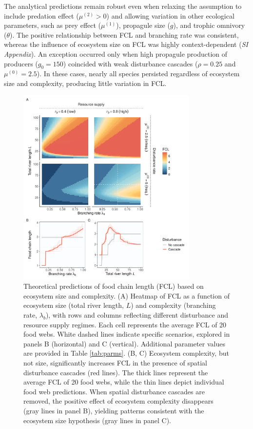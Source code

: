 \documentclass[11pt, class=article, crop=false]{standalone}
\begin{document}
The analytical predictions remain robust even when relaxing the assumption to include predation effect ($\mu^{(2)} > 0$) and allowing variation in other ecological parameters, such as prey effect ($\mu^{(1)}$), propagule size ($g$), and trophic omnivory ($\theta$).
The positive relationship between FCL and branching rate was consistent, whereas the influence of ecosystem size on FCL was highly context-dependent (\textit{SI Appendix}).
An exception occurred only when high propagule production of producers ($g_0 = 150$) coincided with weak disturbance cascades ($\rho = 0.25$ and $\mu^{(0)} = 2.5$).
In these cases, nearly all species persisted regardless of ecosystem size and complexity, producing little variation in FCL.

\begin{figure}
    \centering
    \includegraphics[width=0.8\textwidth]{data_fmt/fig_theo_main.pdf}
    \caption{Theoretical predictions of food chain length (FCL) based on ecosystem size and complexity. (A) Heatmap of FCL as a function of ecosystem size (total river length, $L$) and complexity (branching rate, $\lambda_b$), with rows and columns reflecting different disturbance and resource supply regimes. Each cell represents the average FCL of 20 food webs. White dashed lines indicate specific scenarios, explored in panels B (horizontal) and C (vertical). Additional parameter values are provided in Table \ref{tab:parms}. (B, C) Ecosystem complexity, but not size, significantly increases FCL in the presence of spatial disturbance cascades (red lines). The thick lines represent the average FCL of 20 food webs, while the thin lines depict individual food web predictions. When spatial disturbance cascades are removed, the positive effect of ecosystem complexity disappears (gray lines in panel B), yielding patterns consistent with the ecosystem size hypothesis (gray lines in panel C).}
    \label{fig:sim-main}
\end{figure}
\end{document}
